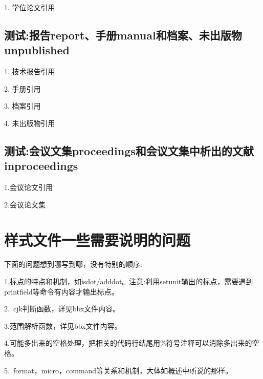 \documentclass[11pt]{article} %
\begin{document}
\begin{refsection}
1. 学位论文引用\cite{张若凌2004--}\cite{athesis1}

\printbibliography[heading=bibliography,title=【硕博士论文】]
\end{refsection}


\subsection{测试:报告report、手册manual和档案、未出版物unpublished}


\begin{refsection}
1. 技术报告引用\cite{Eggrers--,Humphrey1971--}

2. 手册引用\cite{Robertson2011--}

3. 档案引用\cite{中国第一历史档案馆2001--}

4. 未出版物引用\cite{包太雷2013--}

\printbibliography[heading=bibliography,title=【报告、手册和档案、未出版物】]
\end{refsection}


\subsection{测试:会议文集proceedings和会议文集中析出的文献inproceedings}

\begin{refsection}
1.会议论文引用
\cite{Choi2002-1075-1080,Firoozbakhsh2003-473-477,ay5,ay7,inproceeding1,贾东琴2011-45-52}

2.会议论文集
\cite{aproceedings2,aproceedings3,中国力学学会1999--}

\printbibliography[heading=bibliography,title=【会议文集和论文】]
\end{refsection}

\section{样式文件一些需要说明的问题}
下面的问题想到哪写到哪，没有特别的顺序:

1.标点的特点和机制，如isdot/adddot。注意:利用setunit输出的标点，需要遇到printfield等命令有内容才输出标点。

2.~cjk判断函数，详见bbx文件内容。

3.范围解析函数，详见bbx文件内容。

4.可能多出来的空格处理，把相关的代码行结尾用\%符号注释可以消除多出来的空格。

5.~format，micro，command等关系和机制，大体如概述中所说的那样。
\end{document}
